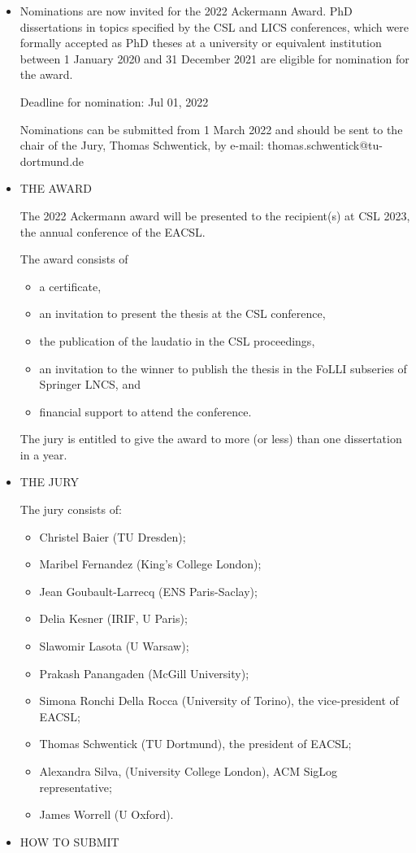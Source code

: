 \documentclass[prodmode,acmtecs]{acmsmall} %
\begin{document}
\begin{itemize}\item  Nominations are now invited for the 2022 Ackermann Award. PhD dissertations in topics specified by the CSL and LICS conferences, which were formally accepted as PhD theses at a university or equivalent institution between 1 January 2020 and 31 December 2021 are eligible for nomination for the award. 
 
Deadline for nomination: Jul 01, 2022 
 
  Nominations can be submitted from 1 March 2022 and should be sent to the chair of the Jury, Thomas Schwentick, by e-mail: thomas.schwentick@tu-dortmund.de 
 
\item  THE AWARD  
 
  The 2022 Ackermann award will be presented to the recipient(s) at CSL 2023, the annual conference of the EACSL. 
 
  The award consists of 
 
\begin{itemize}\item  a certificate, 
\item  an invitation to present the thesis at the CSL conference, 
\item  the publication of the laudatio in the CSL proceedings, 
\item  an invitation to the winner to publish the thesis in the FoLLI subseries of Springer LNCS, and 
\item  financial support to attend the conference.
\end{itemize} 
  The jury is entitled to give the award to more (or less) than one dissertation in a year. 
 
\item  THE JURY 
 
  The jury consists of: 
 
\begin{itemize}\item  Christel Baier (TU Dresden); 
\item  Maribel Fernandez (King’s College London); 
\item  Jean Goubault-Larrecq (ENS Paris-Saclay); 
\item  Delia Kesner (IRIF, U Paris); 
\item  Slawomir Lasota (U Warsaw); 
\item  Prakash Panangaden (McGill University); 
\item  Simona Ronchi Della Rocca (University of Torino), the vice-president of EACSL; 
\item  Thomas Schwentick (TU Dortmund), the president of EACSL; 
\item  Alexandra Silva, (University College London), ACM SigLog representative; 
\item  James Worrell (U Oxford).
\end{itemize} 
\item  HOW TO SUBMIT  
 

\end{itemize}
\end{document}
